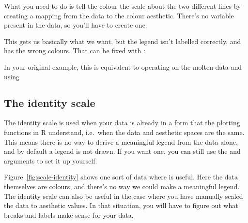 What you need to do is tell the colour the scale about the two different lines by creating a mapping from the data to the colour aesthetic.  There's no variable present in the data, so you'll have to create one:

% 


This gets us basically what we want, but the legend isn't labelled correctly, and has the wrong colours.  That can be fixed with :

% 


In your original example, this is equivalent to operating on the molten data and using 

\subsection{The identity scale}
\label{sub:scale-identity}

The identity scale is used when your data is already in a form that the plotting functions in R understand, i.e.\ when the data and aesthetic spaces are the same.  This means there is no way to derive a meaningful legend from the data alone, and by default a legend is not drawn.  If you want one, you can still use the  and  arguments to set it up yourself.

Figure~\ref{fig:scale-identity} shows one sort of data where  is useful.  Here the data themselves are colours, and there's no way we could make a meaningful legend.  The identity scale can also be useful in the case where you have manually scaled the data to aesthetic values.  In that situation, you will have to figure out what breaks and labels make sense for your data.

% 


